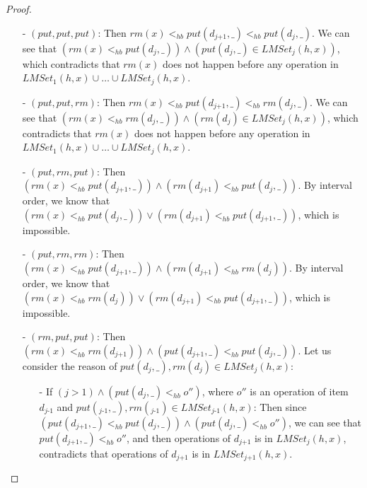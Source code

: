 \begin {proof}
\begin{itemize}
\setlength{\itemsep}{0.5pt}
\item[-] $(\textit{put},\textit{put},\textit{put})$: Then $\textit{rm}(x) <_{hb} \textit{put}(d_{\textit{j+1}},\_) <_{hb} \textit{put}(d_j,\_)$. We can see that $( \textit{rm}(x) <_{hb} \textit{put}(d_j,\_) ) \wedge ( \textit{put}(d_j,\_) \in \textit{LMSet}_j(h,x) )$, which contradicts that $\textit{rm}(x)$ does not happen before any operation in $\textit{LMSet}_1(h,x) \cup \ldots \cup \textit{LMSet}_j(h,x)$.

\item[-] $(\textit{put},\textit{put},\textit{rm})$: Then $\textit{rm}(x) <_{hb} \textit{put}(d_{\textit{j+1}},\_) <_{hb} \textit{rm}(d_j,\_)$. We can see that $( \textit{rm}(x) <_{hb} \textit{rm}(d_j,\_) ) \wedge ( \textit{rm}(d_j) \in \textit{LMSet}_j(h,x) )$, which contradicts that $\textit{rm}(x)$ does not happen before any operation in $\textit{LMSet}_1(h,x) \cup \ldots \cup \textit{LMSet}_j(h,x)$.

\item[-] $(\textit{put},\textit{rm},\textit{put})$: Then $( \textit{rm}(x) <_{hb} \textit{put}(d_{\textit{j+1}},\_) ) \wedge ( \textit{rm}(d_{\textit{j+1}}) <_{hb} \textit{put}(d_j,\_) )$. By interval order, we know that $( \textit{rm}(x) <_{hb} \textit{put}(d_j,\_) ) \vee ( \textit{rm}(d_{\textit{j+1}}) <_{hb} \textit{put}(d_{\textit{j+1}},\_) )$, which is impossible.

\item[-] $(\textit{put},\textit{rm},\textit{rm})$: Then $( \textit{rm}(x) <_{hb} \textit{put}(d_{\textit{j+1}},\_) ) \wedge ( \textit{rm}(d_{\textit{j+1}}) <_{hb} \textit{rm}(d_j) )$. By interval order, we know that $( \textit{rm}(x) <_{hb} \textit{rm}(d_j) ) \vee ( \textit{rm}(d_{\textit{j+1}}) <_{hb} \textit{put}(d_{\textit{j+1}},\_) )$, which is impossible.

\item[-] $(\textit{rm},\textit{put},\textit{put})$: Then $( \textit{rm}(x) <_{hb} \textit{rm}(d_{\textit{j+1}}) ) \wedge ( \textit{put}(d_{\textit{j+1}},\_) <_{hb} \textit{put}(d_j,\_) )$. Let us consider the reason of $\textit{put}(d_j,\_), \textit{rm}(d_j) \in \textit{LMSet}_j(h,x)$:
    \begin{itemize}
    \setlength{\itemsep}{0.5pt}
    \item[-] If $( j > 1 ) \wedge ( \textit{put}(d_j,\_) <_{hb} o'' )$, where $o''$ is an operation of item $d_{\textit{j-1}}$ and $\textit{put}(_{\textit{j-1}},\_), \textit{rm}(_{\textit{j-1}}) \in \textit{LMSet}_{\textit{j-1}}(h,x)$: Then since $( \textit{put}(d_{\textit{j+1}},\_) <_{hb} \textit{put}(d_j,\_) ) \wedge ( \textit{put}(d_j,\_) <_{hb} o'' )$, we can see that $\textit{put}(d_{\textit{j+1}},\_) <_{hb} o''$, and then operations of $d_{\textit{j+1}}$ is in $\textit{LMSet}_j(h,x)$, contradicts that operations of $d_{\textit{j+1}}$ is in $\textit{LMSet}_{\textit{j+1}}(h,x)$.


\end{itemize}
\end{itemize}
\end{proof}
